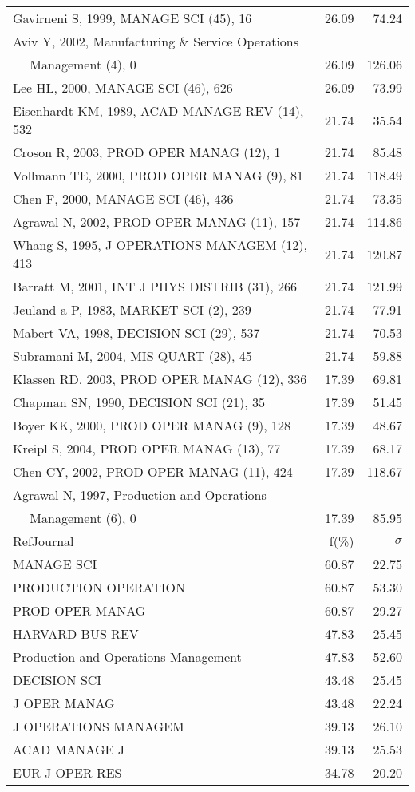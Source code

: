 \documentclass[a4paper,11pt]{report}
\begin{document}
\begin{landscape}
\begin{table}[!ht]
{\begin{tabular}{|l r r|}
Gavirneni S, 1999, MANAGE SCI (45), 16 & 26.09 & 74.24\\
Aviv Y, 2002, Manufacturing \& Service Operations &  & \\
$\quad$ Management (4), 0 & 26.09 & 126.06\\
Lee HL, 2000, MANAGE SCI (46), 626 & 26.09 & 73.99\\
Eisenhardt KM, 1989, ACAD MANAGE REV (14), 532 & 21.74 & 35.54\\
Croson R, 2003, PROD OPER MANAG (12), 1 & 21.74 & 85.48\\
Vollmann TE, 2000, PROD OPER MANAG (9), 81 & 21.74 & 118.49\\
Chen F, 2000, MANAGE SCI (46), 436 & 21.74 & 73.35\\
Agrawal N, 2002, PROD OPER MANAG (11), 157 & 21.74 & 114.86\\
Whang S, 1995, J OPERATIONS MANAGEM (12), 413 & 21.74 & 120.87\\
Barratt M, 2001, INT J PHYS DISTRIB (31), 266 & 21.74 & 121.99\\
Jeuland a P, 1983, MARKET SCI (2), 239 & 21.74 & 77.91\\
Mabert VA, 1998, DECISION SCI (29), 537 & 21.74 & 70.53\\
Subramani M, 2004, MIS QUART (28), 45 & 21.74 & 59.88\\
Klassen RD, 2003, PROD OPER MANAG (12), 336 & 17.39 & 69.81\\
Chapman SN, 1990, DECISION SCI (21), 35 & 17.39 & 51.45\\
Boyer KK, 2000, PROD OPER MANAG (9), 128 & 17.39 & 48.67\\
Kreipl S, 2004, PROD OPER MANAG (13), 77 & 17.39 & 68.17\\
Chen CY, 2002, PROD OPER MANAG (11), 424 & 17.39 & 118.67\\
Agrawal N, 1997, Production and Operations &  & \\
$\quad$ Management (6), 0 & 17.39 & 85.95\\
\hline
\hline
RefJournal & f(\%) & $\sigma$\\
\hline
MANAGE SCI & 60.87 & 22.75\\
PRODUCTION OPERATION & 60.87 & 53.30\\
PROD OPER MANAG & 60.87 & 29.27\\
HARVARD BUS REV & 47.83 & 25.45\\
Production and Operations Management & 47.83 & 52.60\\
DECISION SCI & 43.48 & 25.45\\
J OPER MANAG & 43.48 & 22.24\\
J OPERATIONS MANAGEM & 39.13 & 26.10\\
ACAD MANAGE J & 39.13 & 25.53\\
EUR J OPER RES & 34.78 & 20.20\\
\hline
\end{tabular}
}
\end{table}

\end{landscape}
\end{document}
